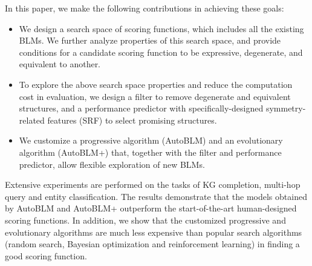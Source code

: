 \documentclass[10pt,journal,compsoc]{IEEEtran}
\begin{document}
In this paper,
we make the following contributions in achieving these goals:
\begin{itemize}[leftmargin = 10px,itemsep=1px]
\item 
We design a search space
of scoring functions, which includes all the
existing BLMs.
We further analyze properties of this search space,
and provide conditions for a candidate scoring function
to be expressive,
degenerate, and equivalent to another.


\item 
To explore the above search space properties 
and reduce the computation cost in evaluation,
we design 
a filter to remove degenerate and equivalent structures,
and a performance predictor with specifically-designed symmetry-related features (SRF) 
to select promising structures.

\item 
We customize a progressive algorithm (AutoBLM)
and an evolutionary algorithm (AutoBLM+)
that,
together with the filter and performance predictor,
allow flexible exploration of new BLMs.
\end{itemize}

Extensive experiments are 
performed on the 
tasks
of KG completion, multi-hop query and entity classification.
The results
demonstrate that the models obtained by AutoBLM and
AutoBLM+
outperform the start-of-the-art 
human-designed 
scoring functions.
In addition,
we show that the customized progressive and evolutionary algorithms are 
much less expensive than popular search algorithms
(random search, Bayesian optimization
and reinforcement learning)
in finding a good scoring function.
\end{document}
